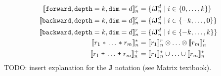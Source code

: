 \newcommand{\singleEntry}[2]{\textbf{J}_{#2}^{#1}}
\begin{align*}
%
%
\interp{\stenFwd{k}{d}}^r_n & =
 \{i\singleEntry{d}{n} \mid i \in \{0, \ldots, k\} \} \\
\interp{\stenBwd{k}{d}}^r_n & =
 \{i\singleEntry{d}{n} \mid i \in \{-k, \ldots, 0\} \} \\
\interp{\stenCen{k}{d}}^r_n & =
 \{i\singleEntry{d}{n} \mid i \in \{-k, \ldots, k\} \} \\
%
%
\interp{r_1 \; \texttt{$\ast$} \, \ldots \, \texttt{$\ast$} \; r_m}^{\ast}_n &
= \interp{r_1}^r_n \otimes \ldots \otimes \interp{r_m}^r_n \\
%
%
\interp{r_1 \; \texttt{+} \, \ldots \, \texttt{+} \; r_m}^{+}_n &
= \interp{r_1}^{\ast}_n \cup \ldots \cup \interp{r_m}^{\ast}_n \\
\end{align*}
TODO: insert explanation for the $\textbf{J}$ notation (see Matrix
textbook).

